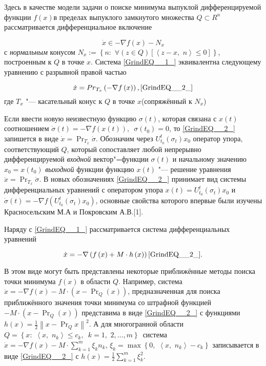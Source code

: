 \vzmscaption


Здесь в качестве модели задачи о поиске минимума выпуклой дифференцируемой функции $f\left(x\right)$в пределах выпуклого замкнутого множества $Q\subset R^{n} $рассматривается дифференциальное включение

\begin{equation} \label{GrindEQ__1_} \dot{x}\in -\nabla f\left(x\right)-N_{x}  \end{equation}
с \textit{нормальным} конусом $N_{x} :=\left\{n:\, \, \forall \left(z\in Q\right)\left[\left\langle z-x,\, \, n\right\rangle \le 0\right]\right\}$, построенным к $Q$ в точке $x$. Система \eqref{GrindEQ__1_}  эквивалентна следующему уравнению с разрывной правой частью

$$\dot{x}={Pr}_{T_{x} } \left(-\nabla f\left(x\right)\right),\eqref{GrindEQ__2_}$$
где $T_{x} $ "--- касательный конус к $Q$ в точке $x$(сопряжённый к $N_{x} $)

Если ввести новую неизвестную функцию $\sigma (t)$, которая связана с $x(t)$ соотношением $\dot{\sigma }(t)=-\nabla f\left(x\left(t\right)\right),\, \, \, \sigma (t_{0} )=0$, то \eqref{GrindEQ__2_} запишется в виде $\dot{x}=\Pr _{T_{x} } \dot{\sigma }$. Обозначим через $U_{t_{0} }^{t} (\sigma _{t} )x_{0} $ оператор упора, соответствующий $Q$, который сопоставляет любой непрерывно дифференцируемой \textit{входной }вектор"=функции $\sigma (t)$ и начальному значению $x_{0} =x(t_{0} )$\textit{ выходной} функции функцию $x(t)$ "--- решение уравнения $\dot{x}=\Pr _{T_{x} } \dot{\sigma }$. В новых обозначениях \eqref{GrindEQ__2_} принимает вид системы дифференциальных уравнений с оператором упора $x(t)=U_{t_{0} }^{t} (\sigma _{t} )x_{0} $ и $\dot{\sigma }(t)=-\nabla f\left(U_{t_{0} }^{t} (\sigma _{t} )x_{0} \right)$, основные свойства которого впервые были изучены Красносельским М.А и Покровским А.В.[1].

Наряду с \eqref{GrindEQ__1_} рассматривается система дифференциальных уравнений

$$\dot{x}=-\nabla \left(f\left(x\right)+M\cdot h\left(x\right)\right)\eqref{GrindEQ__2_}.$$

В этом виде могут быть представлены некоторые приближённые методы поиска точки минимума $f\left(x\right)$ в области $Q$. Например, система $\dot{x}=-\nabla f\left(x\right)-M\cdot \left(x-\Pr _{Q} \left(x\right)\right)$, предназначенная для поиска приближённого значения точки минимума со штрафной функцией $-M\cdot \left(x-\Pr _{Q} \left(x\right)\right)$ представима в виде \eqref{GrindEQ__2_} с функциями $h\left(x\right)=\frac{1}{2} \left\| x-\Pr _{Q} x\right\| ^{2} $. А для многогранной области $Q=\left\{x:\, \, \left\langle x,\, \, n_{k} \right\rangle \le c_{k} ,\, \, \, k=1,\, \, 2,\ldots ,m\right\}\, $ система $\dot{x}=-\nabla f\left(x\right)-M\cdot \sum _{k=1}^{m}\xi _{k} n_{k}  $, $\xi _{k} =\max \left\{0,\, \, \left\langle x,\, \, n_{k} \right\rangle -c_{k} \right\}$ записывается в виде \eqref{GrindEQ__2_} с $h\left(x\right)=\frac{1}{2} \sum _{k=1}^{m}\xi _{k}^{2}  $.

